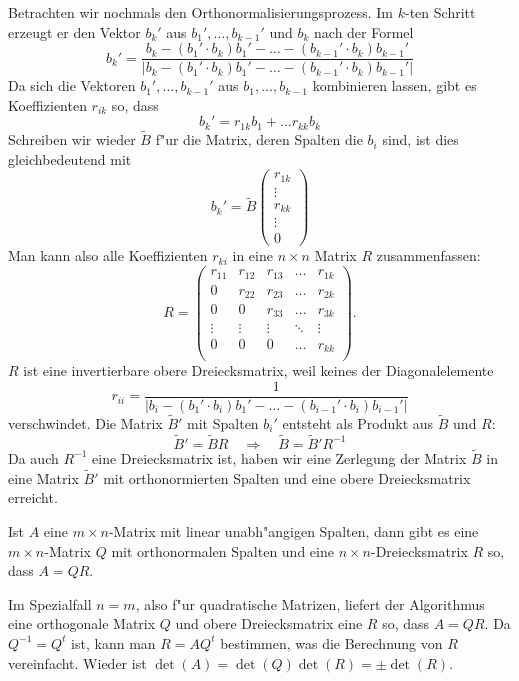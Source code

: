 Betrachten wir nochmals den Orthonormalisierungsprozess.
Im $k$-ten Schritt erzeugt er den Vektor $b_k'$ aus $b_1',\dots,b_{k-1}'$
und $b_k$ nach der Formel
\[
b_k'=\frac{
b_k-(b_1'\cdot b_k)b_1'-\dots-(b_{k-1}'\cdot b_k)b_{k-1}'
}{|
b_k-(b_1'\cdot b_k)b_1'-\dots-(b_{k-1}'\cdot b_k)b_{k-1}'
|}
\]
Da sich die Vektoren $b_1',\dots,b_{k-1}'$ aus 
$b_1,\dots,b_{k-1}$ kombinieren lassen, gibt es Koeffizienten $r_{ik}$
so, dass
\[
b_k'=r_{1k}b_1+\dots r_{kk}b_k
\]
Schreiben wir wieder $\tilde B$ f"ur die Matrix, deren Spalten die
$b_i$ sind, ist dies gleichbedeutend mit
\[
b_k'=\tilde B\begin{pmatrix}r_{1k}\\\vdots\\r_{kk}\\\vdots\\0\end{pmatrix}
\]
Man kann also alle Koeffizienten $r_{ki}$ in eine $n\times n$ Matrix $R$
zusammenfassen:
\[
R=\begin{pmatrix}
r_{11}&r_{12}&r_{13}&\dots &r_{1k}\\
0     &r_{22}&r_{23}&\dots &r_{2k}\\
0     &0     &r_{33}&\dots &r_{3k}\\
\vdots&\vdots&\vdots&\ddots&\vdots\\
0     &0     &0     &\dots &r_{kk}\\
\end{pmatrix}.
\]
$R$ ist eine invertierbare
obere Dreiecksmatrix, weil keines der
Diagonalelemente
\[
r_{ii}=\frac1{|
b_i-(b_1'\cdot b_i)b_1'-\dots-(b_{i-1}'\cdot b_i)b_{i-1}'
|}
\]
verschwindet.
Die Matrix $\tilde B'$ mit Spalten $b_i'$ entsteht als Produkt aus $\tilde B$
und $R$:
\[
\tilde B'=\tilde BR
\quad\Rightarrow\quad
\tilde B=\tilde B'R^{-1}
\]
Da auch $R^{-1}$ eine Dreiecksmatrix ist, haben wir eine Zerlegung der
Matrix $\tilde B$ in eine Matrix $\tilde B'$ mit orthonormierten
Spalten und eine obere Dreiecksmatrix erreicht.

\begin{satz}[QR-Zerlegung]
Ist $A$ eine $m\times n$-Matrix mit linear unabh"angigen Spalten,
dann gibt es eine $m\times n$-Matrix $Q$ mit orthonormalen Spalten
und eine $n\times n$-Dreiecksmatrix $R$ so, dass $A=QR$.
\end{satz}

Im Spezialfall $n=m$, also f"ur quadratische Matrizen, liefert der
Algorithmus eine orthogonale Matrix $Q$ und obere Dreiecksmatrix eine $R$
so, dass $A=QR$.
Da $Q^{-1}=Q^t$ ist, kann man $R=AQ^t$ bestimmen,
was die Berechnung von $R$ vereinfacht.
Wieder ist $\det(A)=\det(Q)\det(R)=\pm\det(R)$.

